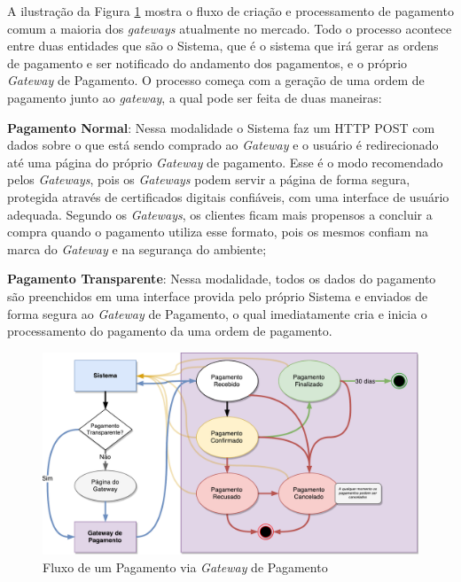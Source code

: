 A ilustração da Figura \ref{fig:gateway} mostra o fluxo de criação e processamento de pagamento comum a maioria dos \emph{gateways} atualmente no mercado. Todo o processo acontece entre duas entidades que são o Sistema, que é o sistema que irá gerar as ordens de pagamento e ser notificado do andamento dos pagamentos, e o próprio \emph{Gateway} de Pagamento. O processo começa com a geração de uma ordem de pagamento junto ao \emph{gateway}, a qual pode ser feita de duas maneiras:

\begin{lista}
	\item \textbf{Pagamento Normal}: Nessa modalidade o Sistema faz um HTTP POST com dados sobre o que está sendo comprado ao \emph{Gateway} e o usuário é redirecionado até uma página do próprio \emph{Gateway} de pagamento. Esse é o modo recomendado pelos \emph{Gateways}, pois os \emph{Gateways} podem servir a página de forma segura, protegida através de certificados digitais confiáveis, com uma interface de usuário adequada. Segundo os \emph{Gateways}, os clientes ficam mais propensos a concluir a compra quando o pagamento utiliza esse formato, pois os mesmos confiam na marca do \emph{Gateway} e na segurança do ambiente;
	\item \textbf{Pagamento Transparente}: Nessa modalidade, todos os dados do pagamento são preenchidos em uma interface provida pelo próprio Sistema e enviados de forma segura ao \emph{Gateway} de Pagamento, o qual imediatamente cria e inicia o processamento do pagamento da uma ordem de pagamento.
\end{lista}

\begin{figure}[H]
	\caption{\label{fig:gateway}Fluxo de um Pagamento via \emph{Gateway} de Pagamento}
    \centering
    \includegraphics[scale=0.575]{imagens/processo_gateway.pdf}
\end{figure}

